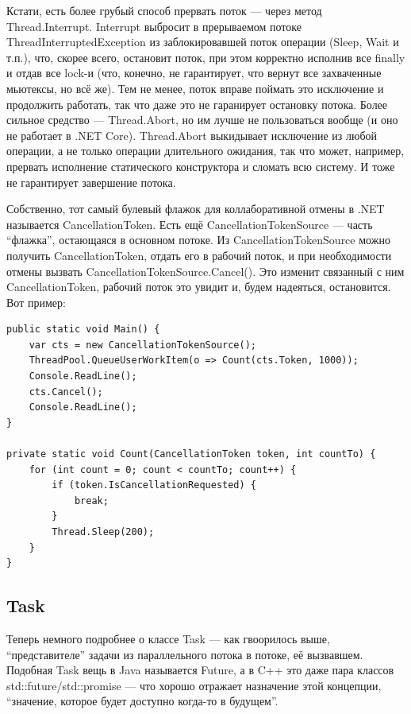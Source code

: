 \documentclass[a5paper]{article}
\begin{document}
Кстати, есть более грубый способ прервать поток --- через метод Thread.Interrupt. Interrupt выбросит в прерываемом потоке ThreadInterruptedException из заблокировавшей поток операции (Sleep, Wait и т.п.), что, скорее всего, остановит поток, при этом корректно исполнив все finally и отдав все lock-и (что, конечно, не гарантирует, что вернут все захваченные мьютексы, но всё же). Тем не менее, поток вправе поймать это исключение и продолжить работать, так что даже это не гаранирует остановку потока. Более сильное средство --- Thread.Abort, но им лучше не пользоваться вообще (и оно не работает в .NET Core). Thread.Abort выкидывает исключение из любой операции, а не только операции длительного ожидания, так что может, например, прервать исполнение статического конструктора и сломать всю систему. И тоже не гарантирует завершение потока.

Собственно, тот самый булевый флажок для коллаборативной отмены в .NET называется CancellationToken. Есть ещё CancellationTokenSource --- часть ``флажка'', остающаяся в основном потоке. Из CancellationTokenSource можно получить CancellationToken, отдать его в рабочий поток, и при необходимости отмены вызвать CancellationTokenSource.Cancel(). Это изменит связанный с ним CancellationToken, рабочий поток это увидит и, будем надеяться, остановится. Вот пример:

\begin{verbatim}
public static void Main() {
    var cts = new CancellationTokenSource();
    ThreadPool.QueueUserWorkItem(o => Count(cts.Token, 1000));
    Console.ReadLine();
    cts.Cancel();
    Console.ReadLine();
}

private static void Count(CancellationToken token, int countTo) {
    for (int count = 0; count < countTo; count++) {
        if (token.IsCancellationRequested) {
            break;
        }
        Thread.Sleep(200); 
    }
}
\end{verbatim}

\subsection{Task}

Теперь немного подробнее о классе Task --- как гвоорилось выше, ``представителе'' задачи из параллельного потока в потоке, её вызвавшем. Подобная Task вещь в Java называется Future, а в C++ это даже пара классов std::future/std::promise --- что хорошо отражает назначение этой концепции, ``значение, которое будет доступно когда-то в будущем''. 
\end{document}
